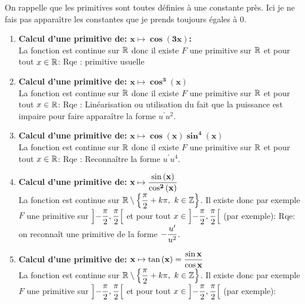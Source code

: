 \documentclass[a4paper, 11pt,reqno]{article}
\begin{document}
\begin{correction}  \;
	\noindent On rappelle que les primitives sont toutes d\'efinies \`{a} une constante pr\`{e}s. Ici je ne fais pas appara\^{i}tre les constantes que je prends toujours \'egales \`{a} 0.
	\begin{enumerate}
		\item \textbf{Calcul d'une primitive de: $\mathbf{x\mapsto \cos{(3x)}}$:}\\
		      \noindent La fonction est continue sur $\mathbb{R}$ donc il existe $F$ une primitive sur $\mathbb{R}$ et pour tout $x\in\mathbb{R}$: 
		Rqe : primitive usuelle      
		\item \textbf{Calcul d'une primitive de: $\mathbf{x\mapsto \cos^3{(x)}}$}\\
		      \noindent La fonction est continue sur $\mathbb{R}$ donc il existe $F$ une primitive sur $\mathbb{R}$ et pour tout $x\in\mathbb{R}$: 
        Rqe : Lin\'earisation ou utilisation du fait que la puissance est impaire pour faire appara\^{i}tre la forme $u^{\prime}u^2$.
		\item \textbf{Calcul d'une primitive de: $\mathbf{x\mapsto \cos{(x)}\sin^4{(x)}}$}\\
		      \noindent La fonction est continue sur $\mathbb{R}$ donc il existe $F$ une primitive sur $\mathbb{R}$ et pour tout $x\in\mathbb{R}$:  
        Rqe : Reconna\^{i}tre la forme $u^{\prime}u^4$.
		\item \textbf{Calcul d'une primitive de: $\mathbf{x\mapsto \displaystyle\frac{\sin{(x)}}{\cos^2{(x)}}}$}\\
		      \noindent  La fonction est continue sur $\R\setminus\left\lbrace \ddp\frac{\pi}{2}+k\pi,\ k\in\Z\right\rbrace$. Il existe donc par exemple $F$ une primitive sur $\left\rbrack -\displaystyle\frac{\pi}{2},\displaystyle\frac{\pi}{2}\right\lbrack$ et pour tout $x\in\left\rbrack -\displaystyle\frac{\pi}{2},\displaystyle\frac{\pi}{2}\right\lbrack $ (par exemple): 
        Rqe: on reconna\^{i}t une primitive de la forme $-\displaystyle\frac{u^{\prime}}{u^2}$.
		\item \textbf{Calcul d'une primitive de: $\mathbf{x\mapsto \tan{(x)}=\displaystyle\frac{\sin{x}}{\cos{x}}}$} \\
		      \noindent La fonction est continue sur $\R\setminus\left\lbrace \ddp\frac{\pi}{2}+k\pi,\ k\in\Z\right\rbrace$. Il existe donc par exemple $F$ une primitive sur $\left\rbrack -\displaystyle\frac{\pi}{2},\displaystyle\frac{\pi}{2}\right\lbrack$ et pour tout $x\in\left\rbrack -\displaystyle\frac{\pi}{2},\displaystyle\frac{\pi}{2}\right\lbrack $ (par exemple): 

\end{enumerate}
\end{correction}
\end{document}
